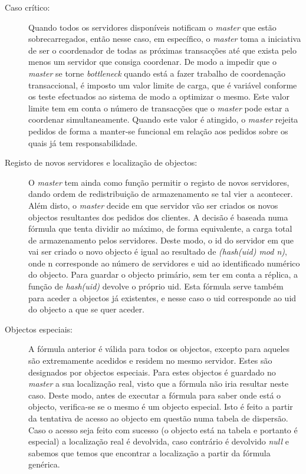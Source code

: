 \begin{description}
\item[Caso crítico:]
Quando todos os servidores disponíveis notificam o \textit{master} que estão sobrecarregados, então nesse caso, em específico, o \textit{master} toma a iniciativa de ser o coordenador de todas as próximas transacções até que exista pelo menos um servidor que consiga coordenar. De modo a impedir que o \textit{master} se torne \textit{bottleneck} quando está a fazer trabalho de coordenação transaccional, é imposto um valor limite de carga, que é variável conforme os teste efectuados ao sistema de modo a optimizar o mesmo. Este valor limite tem em conta o número de transacções que o \textit{master} pode estar a coordenar simultaneamente. Quando este valor é atingido, o \textit{master} rejeita pedidos de forma a manter-se funcional em relação aos pedidos sobre os quais já tem responsabilidade. 

\item[Registo de novos servidores e localização de objectos:]
O \textit{master} tem ainda como função permitir o registo de novos servidores, dando ordem de redistribuição de armazenamento se tal vier a acontecer. Além disto, o \textit{master} decide em que servidor vão ser criados os novos objectos resultantes dos pedidos dos clientes. A decisão é baseada numa fórmula que tenta dividir ao máximo, de forma equivalente, a carga total de armazenamento pelos servidores. Deste modo, o id do servidor em que vai ser criado o novo objecto é igual ao resultado de \textit{(hash(uid) mod n)}, onde n corresponde ao número de servidores e uid ao identificado numérico do objecto. Para guardar o objecto primário, sem ter em conta a réplica, a função de \textit{hash(uid)} devolve o próprio uid. Esta fórmula serve também para aceder a objectos já existentes, e nesse caso o uid corresponde ao uid do objecto a que se quer aceder.

\item[Objectos especiais:]
A fórmula anterior é válida para todos os objectos, excepto para aqueles são extremamente acedidos e residem no mesmo servidor. Estes são designados por objectos especiais. Para estes objectos é guardado no \textit{master} a sua localização real, visto que a fórmula não iria resultar neste caso. Deste modo, antes de executar a fórmula para saber onde está o objecto, verifica-se se o mesmo é um objecto especial. Isto é feito a partir da tentativa de acesso ao objecto em questão numa tabela de dispersão. Caso o acesso seja feito com sucesso (o objecto está na tabela e portanto é especial) a localização real é devolvida, caso contrário é devolvido \textit{null} e sabemos que temos que encontrar a localização a partir da fórmula genérica.


\end{description}
